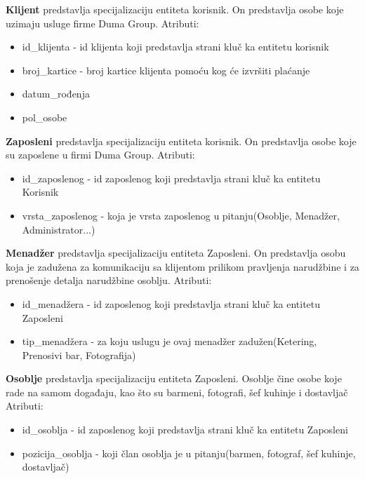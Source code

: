 \documentclass[a4paper]{article}
\begin{document}
\vspace{3mm}

\textbf{Klijent} predstavlja specijalizaciju entiteta korisnik. On predstavlja osobe koje uzimaju usluge firme Duma Group. Atributi:
\begin{itemize}
    \item id\_klijenta - id klijenta koji predstavlja strani kluč ka entitetu korisnik
    \item broj\_kartice - broj kartice klijenta pomoću kog će izvršiti plaćanje
    \item datum\_rođenja
    \item pol\_osobe
\end{itemize}

\textbf{Zaposleni} predstavlja specijalizaciju entiteta korisnik. On predstavlja osobe koje su zaposlene u firmi Duma Group. Atributi:
\begin{itemize}
    \item id\_zaposlenog - id zaposlenog koji predstavlja strani kluč ka entitetu Korisnik
    \item vrsta\_zaposlenog - koja je vrsta zaposlenog u pitanju(Osoblje, Menadžer, Administrator...)
\end{itemize}

\textbf{Menadžer} predstavlja specijalizaciju entiteta Zaposleni. On predstavlja osobu koja je zadužena za komunikaciju sa klijentom prilikom pravljenja narudžbine i za prenošenje detalja narudžbine osoblju. Atributi:
\begin{itemize}
    \item id\_menadžera - id zaposlenog koji predstavlja strani kluč ka entitetu Zaposleni
    \item tip\_menadžera - za koju uslugu je ovaj menadžer zadužen(Ketering, Prenosivi bar, Fotografija) 
\end{itemize}

\textbf{Osoblje} predstavlja specijalizaciju entiteta Zaposleni. Osoblje čine osobe koje rade na samom događaju, kao što su barmeni, fotografi, šef kuhinje i dostavljač Atributi:
\begin{itemize}
    \item id\_osoblja - id zaposlenog koji predstavlja strani kluč ka entitetu Zaposleni
    \item pozicija\_osoblja - koji član osoblja je u pitanju(barmen, fotograf, šef kuhinje, dostavljač) 
\end{itemize}


\vspace{3mm}
\end{document}
